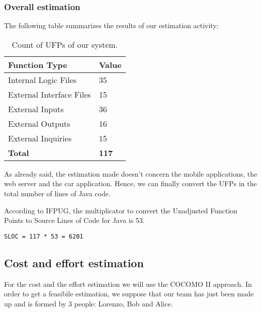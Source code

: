 \subsubsection{Overall estimation}

The following table summarizes the results of our estimation activity:

\vspace{2em}

\begin{table}[H]
    \centering
    \begin{tabular}{| l | l |}
        \hline
        \textbf{Function Type} & \textbf{Value} \\
        \hline
        Internal Logic Files    & 35    \\
        External Interface Files    & 15    \\
        External Inputs   & 36     \\
        External Outputs   & 16    \\
        External Inquiries   & 15    \\
        \hline
        \textbf{Total}  & \textbf{117} \\
        \hline
    \end{tabular}
    \caption{Count of UFPs of our system.}
\end{table}
As already said, the estimation made doesn't concern the mobile applications, the web server and the car application. Hence, we can finally convert the UFPs in the total number of lines of Java code.

According to IFPUG, the multiplicator to convert the Unadjusted Function Points to Source Lines of Code for Java is 53.

\vspace{1em}

\begin{lstlisting}[stepnumber=0, frame=single]
	SLOC = 117 * 53 = 6201
\end{lstlisting}

\subsection{Cost and effort estimation} \label{cost-effort-est}

For the cost and the effort estimation we will use the COCOMO II approach. In order to get a feasibile estimation, we suppose that our team has just been made up and is formed by 3 people: Lorenzo, Bob and Alice.

